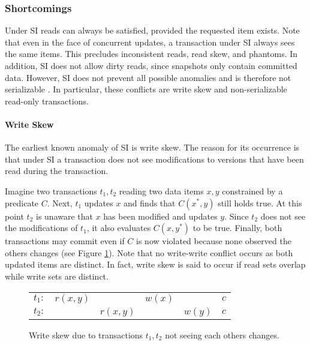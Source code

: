 \subsubsection{Shortcomings}

Under \ac{SI} reads can always be satisfied, provided the requested item exists.
Note that even in the face of concurrent updates, a transaction under \ac{SI}
always sees the same items. This precludes inconsistent reads, read skew, and
phantoms. In addition, \ac{SI} does not allow dirty reads, since snapshots only
contain committed data. However, \ac{SI} does not prevent all possible anomalies
and is therefore not serializable \cite{berenson1995critique, fekete2004read}.
In particular, these conflicts are write skew and non-serializable read-only
transactions.

\paragraph{Write Skew}

The earliest known anomaly of \ac{SI} is write skew. The reason for its
occurrence is that under \ac{SI} a transaction does not see modifications to
versions that have been read during the transaction.

Imagine two transactions $t_1, t_2$ reading two data items $x, y$ constrained by
a predicate $C$. Next, $t_1$ updates $x$ and finds that $C(x^{*}, y)$ still
holds true. At this point $t_2$ is unaware that $x$ has been modified and
updates $y$. Since $t_2$ does not see the modifications of $t_1$, it also
evaluates $C(x, y^{*})$ to be true. Finally, both transactions may commit even
if $C$ is now violated because none observed the others changes (see Figure
\ref{fig:write_skew}). Note that no write-write conflict occurs as both updated
items are distinct. In fact, write skew is said to occur if read sets overlap
while write sets are distinct.

\begin{figure}[!h]
    \centering
    \begin{tabular}{r c c c c c}
        $t_1:$ & $r(x,y)$ &          & $w(x)$ &        & $c$ \\
        $t_2:$ &          & $r(x,y)$ &        & $w(y)$ & $c$ \\
    \end{tabular}
    \caption{Write skew due to transactions $t_1, t_2$ not seeing each others changes.}
    \label{fig:write_skew}
\end{figure}

